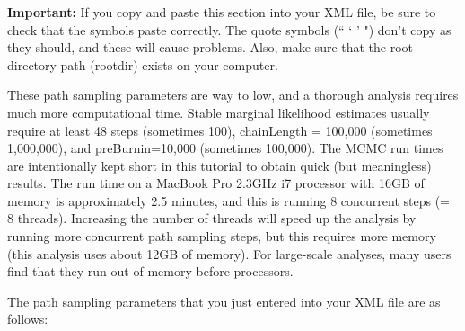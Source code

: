 {\small{
\\ 
\\
\\
\\
\\
\\
\\ 
\\
\\
\\
}


{\bf Important:} If you copy and paste this section into your XML file, be sure to check that the symbols paste correctly. The quote symbols (`` ` ' ") don't copy as they should, and these will cause problems. Also, make sure that the root directory path (rootdir) exists on your computer.

	These path sampling parameters are way to low, and a thorough analysis requires much more computational time. Stable marginal likelihood estimates usually require at least 48 steps (sometimes 100), chainLength = 100,000 (sometimes 1,000,000), and preBurnin=10,000 (sometimes 100,000). The MCMC run times are 
    intentionally kept short in this tutorial to obtain quick (but meaningless) results. The run time on a MacBook Pro 2.3GHz i7 processor with 16GB of memory is approximately 2.5 minutes, and this is running 8 concurrent steps (= 8 threads). Increasing the number of threads will speed up the analysis by running more concurrent path sampling steps, but this requires more memory (this analysis uses about 12GB of memory). For large-scale analyses, many users find that they run out of memory before processors.

The path sampling parameters that you just entered into your XML file are as follows:

    \begin{compactdesc}
       \item[\field{chainLength: MCMC sample length for each path sampling step.}]
       \item[\field{alpha: parameter used to space out path sampling steps.}]
       \item[\field{rootdir: directory for storing output. Be sure that the folder exists before starting the run.}]
       \item[\field{burnInPercentage: burn-In percentage used for analyzing the log files.}]
       \item[\field{preBurnin: number of samples that are discarded for the first step, but not the others.}]
       \item[\field{deleteOldLogs: delete existing log files from rootdir}]
      \item[\field{nrOfSteps: the number of path sampling steps to use}]
    \end{compactdesc}
    
}
